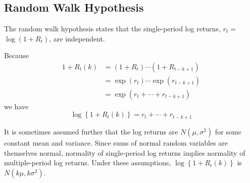 
\chapter{} %

\section{Random Walk Hypothesis}

The random walk hypothesis states that the single-period log returns, $r_{t}=$ $\log \left(1+R_{t}\right)$, are independent. 

Because
$$
\begin{aligned}
1+R_{t}(k) &=\left(1+R_{t}\right) \cdots\left(1+R_{t-k+1}\right) \\
&=\exp \left(r_{t}\right) \cdots \exp \left(r_{t-k+1}\right) \\
&=\exp \left(r_{t}+\cdots+r_{t-k+1}\right)
\end{aligned}
$$
we have
$$
\log \left\{1+R_{t}(k)\right\}=r_{t}+\cdots+r_{t-k+1}
$$

It is sometimes assumed further that the log returns are $N\left(\mu, \sigma^{2}\right)$ for some constant mean and variance. Since sums of normal random variables are themselves normal, normality of single-period log returns implies normality of multiple-period log returns. Under these assumptions, $\log \left\{1+R_{t}(k)\right\}$ is $N\left(k \mu, k \sigma^{2}\right)$. 



